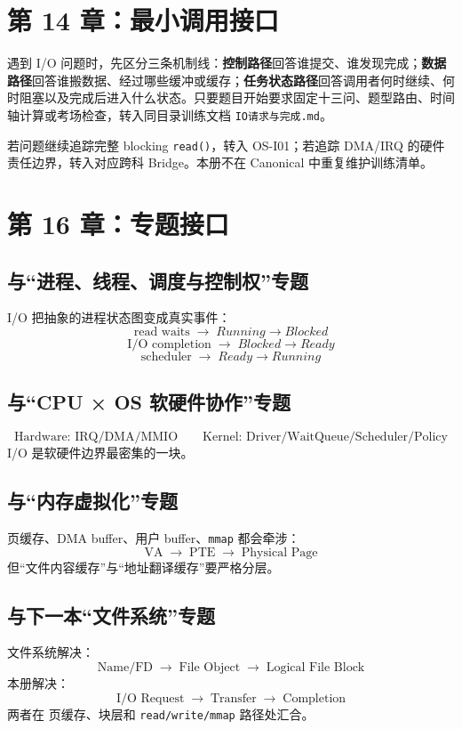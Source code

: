 \documentclass[UTF8,fontset=fandol,11pt,a4paper]{ctexart}
\newcommand{\kw}[1]{\textbf{#1}}
\newcommand{\code}[1]{\texttt{#1}}
\newcommand{\arr}{\;\longrightarrow\;}
\begin{document}
\section{第 14 章：最小调用接口}

遇到 I/O 问题时，先区分三条机制线：\kw{控制路径}回答谁提交、谁发现完成；\kw{数据路径}回答谁搬数据、经过哪些缓冲或缓存；\kw{任务状态路径}回答调用者何时继续、何时阻塞以及完成后进入什么状态。只要题目开始要求固定十三问、题型路由、时间轴计算或考场检查，转入同目录训练文档 \texttt{IO请求与完成.md}。

若问题继续追踪完整 blocking \code{read()}，转入 OS-I01；若追踪 DMA/IRQ 的硬件责任边界，转入对应跨科 Bridge。本册不在 Canonical 中重复维护训练清单。

\section{第 16 章：专题接口}

\subsection{与“进程、线程、调度与控制权”专题}
I/O 把抽象的进程状态图变成真实事件：
\[
\boxed{\text{read waits}\arr Running\to Blocked}
\]
\[
\boxed{\text{I/O completion}\arr Blocked\to Ready}
\]
\[
\boxed{\text{scheduler}\arr Ready\to Running}
\]

\subsection{与“CPU × OS 软硬件协作”专题}
\[
\boxed{
\text{Hardware: IRQ/DMA/MMIO}
\qquad
\text{Kernel: Driver/WaitQueue/Scheduler/Policy}
}
\]
I/O 是软硬件边界最密集的一块。

\subsection{与“内存虚拟化”专题}
页缓存、DMA buffer、用户 buffer、\code{mmap} 都会牵涉：
\[
\text{VA}\arr\text{PTE}\arr\text{Physical Page}
\]
但“文件内容缓存”与“地址翻译缓存”要严格分层。

\subsection{与下一本“文件系统”专题}
文件系统解决：
\[
\boxed{\text{Name/FD}\arr\text{File Object}\arr\text{Logical File Block}}
\]
本册解决：
\[
\boxed{\text{I/O Request}\arr\text{Transfer}\arr\text{Completion}}
\]
两者在 页缓存、块层和 \code{read/write/mmap} 路径处汇合。
\end{document}
